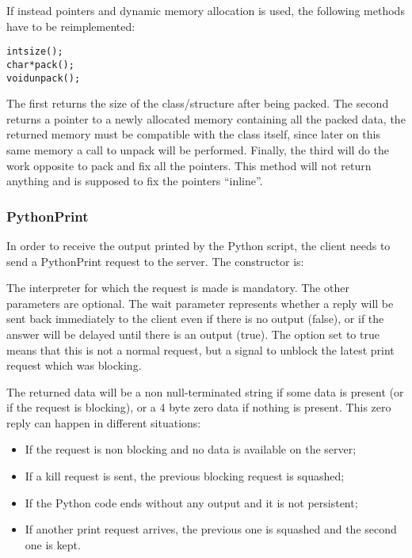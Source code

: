 If instead pointers and dynamic memory allocation is used, the following methods
have to be reimplemented:

\begin{alltt}
int size();
char * pack();
void unpack();
\end{alltt}

The first returns the size of the class/structure after being packed. The second
returns a pointer to a newly allocated memory containing all the packed data,
the returned memory must be compatible with the class itself, since later on
this same memory a call to unpack will be performed. Finally, the third will do
the work opposite to pack and fix all the pointers. This method will not return
anything and is supposed to fix the pointers ``inline''.

\subsubsection{PythonPrint}

\label{pythonPrint}

In order to receive the output printed by the Python script, the client needs to
send a PythonPrint request to the server. The constructor is:


The interpreter for which the request is made is mandatory. The other parameters
are optional. The wait parameter represents whether a reply will be sent back
immediately to the client even if there is no output (false), or if the answer
will be delayed until there is an output (true). The  option set to
true means that this is not a normal request, but a signal to unblock the latest
print request which was blocking.

The returned data will be a non null-terminated string if some data is present
(or if the request is blocking), or a 4 byte zero data if nothing is present.
This zero reply can happen in different situations:

\begin{itemize}
\item If the request is non blocking and no data is available on the server;
\item If a kill request is sent, the previous blocking request is squashed;
\item If the Python code ends without any output and it is not persistent;
\item If another print request arrives, the previous one is squashed and the second one is kept.
\end{itemize}

